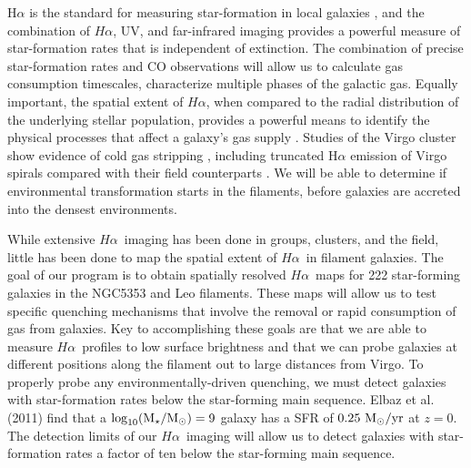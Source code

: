 \documentclass[12pt, preprint]{aastex}
\newcommand{\ha}{$H\alpha$}
\begin{document}
H$\alpha$ is the standard for measuring star-formation in local galaxies
\citep[e.g.][]{kennicutt98}, and the combination of \ha, UV, 
and far-infrared imaging provides a powerful measure of star-formation
rates that is independent of extinction.  The
combination of precise star-formation rates and CO observations will allow us to calculate
gas consumption timescales, characterize multiple phases of the
galactic gas. 
Equally important, the spatial extent of \ha, when compared to the
radial distribution of the underlying stellar population, provides a powerful
means to identify the physical processes that affect a galaxy's gas
supply \citep[e.g.][]{hodge83, dale01, gavazzi12,boselli15}.
Studies of the Virgo cluster show evidence of cold gas stripping
\citep[e.g.][]{koopmann98, koopmann04, dale01, crowl05, chung07,
  corbelli12, gavazzi12, boselli15}, including truncated H$\alpha$ emission of Virgo spirals
compared with their field counterparts \citep{koopmann04}.
We will be able to determine if environmental transformation starts in
the filaments, before galaxies are accreted into the densest environments.

While extensive \ha \ imaging has been done in groups, clusters, and the field,
little has been done to map the spatial extent of \ha \ in filament
galaxies.  
The goal of our program is to obtain spatially resolved \ha \ maps for 222 star-forming galaxies in
the NGC5353 and Leo filaments. These maps will allow us to test specific quenching
mechanisms that involve the removal or rapid consumption of gas from galaxies. Key to accomplishing
these goals are that we are able to measure \ha \ profiles to low surface brightness and that we can
probe galaxies at different positions along the filament out to large
distances from Virgo.
To properly probe any environmentally-driven quenching, we must detect galaxies
with star-formation rates below the star-forming main sequence. Elbaz et al. (2011) find that a
$\rm \log_{10}(M_\star/M_\odot) = 9$ galaxy has a SFR 
of $\rm 0.25~ M_\odot/yr$ at $z = 0$. 
The detection limits of our \ha \ imaging will allow us to detect galaxies with star-formation rates a
factor of ten below the star-forming main sequence.
\end{document}
